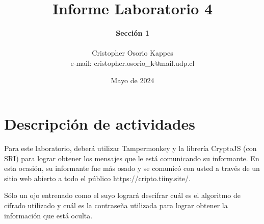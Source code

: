 \documentclass[letter,12pt]{article}
\begin{document}
%
   \title{\Huge{Informe Laboratorio 4}}

   \author{\textbf{Sección 1} \\  \\Cristopher Osorio Kappes \\ e-mail: cristopher.osorio\_k@mail.udp.cl}
          
   \date{Mayo de 2024}

   \maketitle
   
   \tableofcontents
 
  \newpage
  

\section{Descripción de actividades}
Para este laboratorio, deberá utilizar Tampermonkey y la librería CryptoJS (con SRI) para lograr obtener los mensajes que le está comunicando su informante. En esta ocasión, su informante fue más osado y se comunicó con usted a través de un sitio web abierto a todo el público https://cripto.tiiny.site/.\par
Sólo un ojo entrenado como el suyo logrará descifrar cuál es el algoritmo de cifrado utilizado y cuál es la contraseña utilizada para lograr obtener la información que está oculta.
\end{document}
